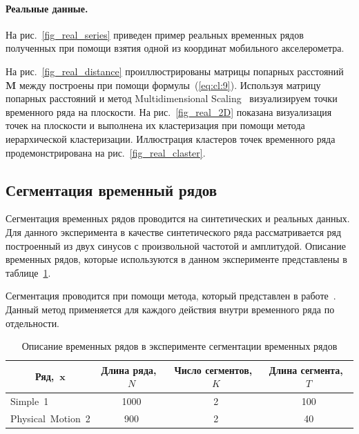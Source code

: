 \documentclass[12pt, twoside]{article}
\numberwithin{equation}{section}
\begin{document}
\paragraph{Реальные данные.}

На рис.~\ref{fig_real_series} приведен пример реальных временных рядов полученных при помощи взятия одной из координат мобильного акселерометра. 



На рис.~\ref{fig_real_distance} проиллюстрированы матрицы попарных расстояний~$\textbf{M}$ между построены при помощи формулы~(\ref{eq:cl:9}). Используя матрицу попарных расстояний и метод Multidimensional Scaling~\cite{Borg2005} визуализируем точки временного ряда на плоскости. На рис.~\ref{fig_real_2D} показана визуализация точек на плоскости и выполнена их кластеризация при помощи метода иерархической кластеризации. Иллюстрация кластеров точек временного ряда продемонстрирована на рис.~\ref{fig_real_claster}.

\subsection{Сегментация временный рядов}
Сегментация временных рядов проводится на синтетических и реальных данных. Для данного эксперимента в качестве синтетического ряда рассматривается ряд построенный из двух синусов с произвольной частотой и амплитудой. Описание временных рядов, которые используются в данном эксперименте представлены в таблице~\ref{table:3}.

Сегментация проводится при помощи метода, который представлен в работе~\cite{motrenko2015}. Данный метод применяется для каждого действия внутри временного ряда по отдельности.


\begin{table}[h!t]
\begin{center}
\caption{Описание временных рядов в эксперименте сегментации временных рядов}
\label{table:3}
\begin{tabular}{|c|c|c|c|}
\hline
	Ряд,~$\textbf{x}$ &Длина ряда,~$N$& Число сегментов,~$K$&Длина сегмента,~$T$\\
	\hline
	\multicolumn{1}{|l|}{Simple~1}
	& 1000& 2& 100\\
	\hline
	\multicolumn{1}{|l|}{Physical~Motion~2}
	& 900& 2& 40\\
\hline

\end{tabular}
\end{center}
\end{table}
\end{document}
